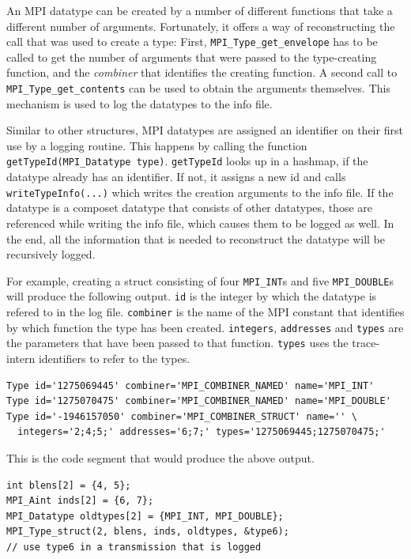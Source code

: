 \documentclass[a4paper,12pt,pdftex]{scrartcl}
\begin{document}
An MPI datatype can be created by a number of different functions that
take a different number of arguments. Fortunately, it offers a way of
reconstructing the call that was used to create a type: First,
\verb/MPI_Type_get_envelope/ has to be called to get the number of
arguments that were passed to the type-creating function, and the
\emph{combiner} that identifies the creating function. A second call
to \verb/MPI_Type_get_contents/ can be used to obtain the arguments
themselves. This mechanism is used to log the datatypes to the info
file.

Similar to other structures, MPI datatypes are assigned an identifier
on their first use by a logging routine. This happens by calling the
function \verb/getTypeId(MPI_Datatype type)/. \verb/getTypeId/ looks
up in a hashmap, if the datatype already has an identifier. If not, it
assigns a new id and calls \verb/writeTypeInfo(...)/ which writes the
creation arguments to the info file. If the datatype is a composet
datatype that consists of other datatypes, those are referenced while
writing the info file, which causes them to be logged as well. In the
end, all the information that is needed to reconstruct the datatype
will be recursively logged.

For example, creating a struct consisting of four \verb/MPI_INT/s and
five \verb/MPI_DOUBLE/s will produce the following output. 
\verb/id/ is the integer by which the datatype is refered to in the
log file. \verb/combiner/ is the name of the MPI constant that
identifies by which function the type has been
created. \verb/integers/, \verb/addresses/ and \verb/types/ are the
parameters that have been passed to that function. \verb/types/ uses
the trace-intern identifiers to refer to the types.
\begin{lstlisting}
Type id='1275069445' combiner='MPI_COMBINER_NAMED' name='MPI_INT'
Type id='1275070475' combiner='MPI_COMBINER_NAMED' name='MPI_DOUBLE'
Type id='-1946157050' combiner='MPI_COMBINER_STRUCT' name='' \
  integers='2;4;5;' addresses='6;7;' types='1275069445;1275070475;'
\end{lstlisting}

This is the code segment that would produce the above output.
\begin{lstlisting}
int blens[2] = {4, 5};
MPI_Aint inds[2] = {6, 7};
MPI_Datatype oldtypes[2] = {MPI_INT, MPI_DOUBLE};
MPI_Type_struct(2, blens, inds, oldtypes, &type6);
// use type6 in a transmission that is logged
\end{lstlisting}
\end{document}
